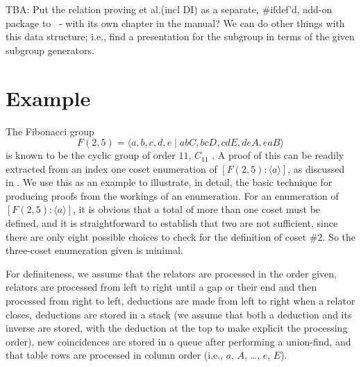 


TBA:
Put the relation proving et al.\@ (incl DI) as a separate, \#ifdef'd,
  add-on package to \ace\ - with its own chapter in the manual?
We can do other things with this data structure; i.e., find a presentation
  for the subgroup in terms of the given subgroup generators.

\section{Example}

The Fibonacci group 
 $$ F(2,5) = \langle a,b,c,d,e \mid abC, bcD, cdE, deA, eaB \rangle $$
  is known to be the cyclic group of order $11$, $C_{11}$ \cite{Can}.
A proof of this can be readily extracted from an index one coset 
  enumeration of $[F(2,5) : \langle a \rangle]$, as discussed in \cite{Lee2}.
We use this as an example to illustrate, in detail, the basic technique for
  producing proofs from the workings of an enumeration.
%
For an enumeration of $[F(2,5) : \langle a \rangle]$, it is obvious that a
  total of more than one coset must be defined, and it is straightforward
  to establish that two are not sufficient, since there are only eight
  possible choices to check for the definition of coset \#$2$.
So the three-coset enumeration given is minimal.

For definiteness, we assume that the relators are processed in the order
  given, relators are processed from left to right until a gap or their
  end and then processed from right to left, deductions are made from left
  to right when a relator closes, deductions are stored in a stack (we 
  assume that both a deduction and its inverse are stored, with the 
  deduction at the top to make explicit the processing order), new
  coincidences are stored in a queue after performing a union-find, and
  that table rows are processed in column order (i.e., 
  $a$, $A$, \dots, $e$, $E$).

